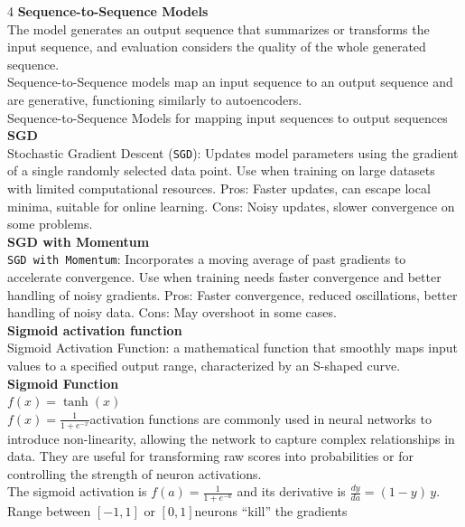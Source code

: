 \documentclass[8pt]{extarticle}
\begin{document}
\begin{multicols}{4}
\vspace{2pt}\textbf{Sequence-to-Sequence Models}\\
The model generates an output sequence that summarizes or transforms the input sequence, and evaluation considers the quality of the whole generated sequence.\\
Sequence-to-Sequence models map an input sequence to an output sequence and are generative, functioning similarly to autoencoders.\\
Sequence-to-Sequence Models for mapping input sequences to output sequences\\
\vspace{2pt}\textbf{SGD}\\
Stochastic Gradient Descent (\texttt{SGD}): Updates model parameters using the gradient of a single randomly selected data point. Use when training on large datasets with limited computational resources. Pros: Faster updates, can escape local minima, suitable for online learning. Cons: Noisy updates, slower convergence on some problems.\\
\vspace{2pt}\textbf{SGD with Momentum}\\
\texttt{SGD with Momentum}: Incorporates a moving average of past gradients to accelerate convergence. Use when training needs faster convergence and better handling of noisy gradients. Pros: Faster convergence, reduced oscillations, better handling of noisy data. Cons: May overshoot in some cases.\\
\vspace{2pt}\textbf{Sigmoid activation function}\\
Sigmoid Activation Function: a mathematical function that smoothly maps input values to a specified output range, characterized by an S-shaped curve.\\
\vspace{2pt}\textbf{Sigmoid Function}\\
$f(x)=\tanh(x)$\\
$f(x)=\frac{1}{1+e^{-x}}$\Sigmoid activation functions are commonly used in neural networks to introduce non-linearity, allowing the network to capture complex relationships in data. They are useful for transforming raw scores into probabilities or for controlling the strength of neuron activations.\\
The sigmoid activation is $f(a)=\frac{1}{1+e^{-a}}$ and its derivative is $\frac{dy}{da}=(1-y)\,y$.\\
Range between $[-1, 1]$ or $[0, 1]$\Saturated neurons ``kill'' the gradients\\

\end{multicols}
\end{document}
